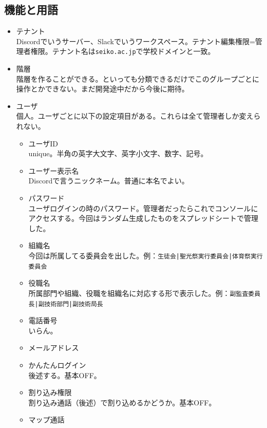 \documentclass[a4paper]{ltjsreport}
\newcommand{\terlogy}[2][|]{\colorbox{terlogy}{\texttt{\lstinline#1#2#1}}}
\begin{document}
\subsection{機能と用語}
\begin{itemize}
  \item テナント\\
        Discordでいうサーバー、Slackでいうワークスペース。テナント編集権限=管理者権限。テナント名は\terlogy{seiko.ac.jp}で学校ドメインと一致。
  \item 階層\\
        階層を作ることができる。といっても分類できるだけでこのグループごとに操作とかできない。まだ開発途中だから今後に期待。
  \item ユーザ\\
        個人。ユーザごとに以下の設定項目がある。これらは全て管理者しか変えられない。
        \begin{itemize}
          \item ユーザID\\
                unique。半角の英字大文字、英字小文字、数字、記号。
          \item ユーザー表示名\\
                Discordで言うニックネーム。普通に本名でよい。
          \item パスワード\\
                ユーザログインの時のパスワード。管理者だったらこれでコンソールにアクセスする。今回はランダム生成したものをスプレッドシートで管理した。
          \item 組織名\\
                今回は所属してる委員会を出した。例：\verb"生徒会|聖光祭実行委員会|体育祭実行委員会"
          \item 役職名\\
                所属部門や組織、役職を組織名に対応する形で表示した。例：\verb"副監査委員長|副技術部門|副技術局長"
          \item 電話番号\\
                いらん。
          \item メールアドレス
          \item かんたんログイン\\
                後述する。基本OFF。
          \item 割り込み権限\\
                割り込み通話（後述）で割り込めるかどうか。基本OFF。
          \item マップ通話\\

\end{itemize}
\end{itemize}
\end{document}
